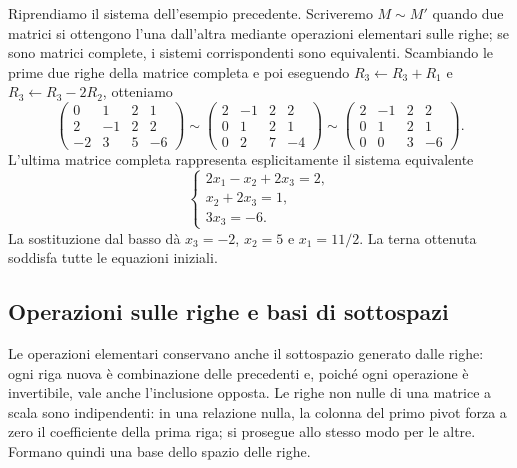 \begin{esempio}
Riprendiamo il sistema dell’esempio precedente. Scriveremo $M\sim M'$ quando due matrici si ottengono l’una dall’altra mediante operazioni elementari sulle righe; se sono matrici complete, i sistemi corrispondenti sono equivalenti. Scambiando le prime due righe della matrice completa e poi eseguendo $R_3\leftarrow R_3+R_1$ e $R_3\leftarrow R_3-2R_2$, otteniamo
\[
 \left(\begin{array}{rrr|r}0&1&2&1\\2&-1&2&2\\-2&3&5&-6\end{array}\right)
 \sim\left(\begin{array}{rrr|r}2&-1&2&2\\0&1&2&1\\0&2&7&-4\end{array}\right)
 \sim\left(\begin{array}{rrr|r}2&-1&2&2\\0&1&2&1\\0&0&3&-6\end{array}\right).
\]
L'ultima matrice completa rappresenta esplicitamente il sistema equivalente
\[
 \begin{cases}
 2x_1-x_2+2x_3=2,\\x_2+2x_3=1,\\3x_3=-6.
 \end{cases}
\]
La sostituzione dal basso dà $x_3=-2$, $x_2=5$ e $x_1=11/2$. La terna ottenuta soddisfa tutte le equazioni iniziali.
\end{esempio}

\subsection{Operazioni sulle righe e basi di sottospazi}
Le operazioni elementari conservano anche il sottospazio generato dalle righe: ogni riga nuova è combinazione delle precedenti e, poiché ogni operazione è invertibile, vale anche l'inclusione opposta. Le righe non nulle di una matrice a scala sono indipendenti: in una relazione nulla, la colonna del primo pivot forza a zero il coefficiente della prima riga; si prosegue allo stesso modo per le altre. Formano quindi una base dello spazio delle righe.

